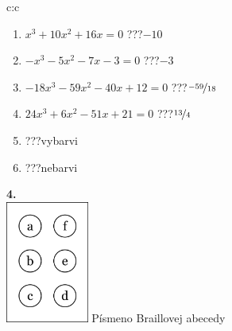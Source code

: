 \documentclass[10pt]{report}
\begin{document}
\begin{tabular}{c:c}
\begin{minipage}[c][104.5mm][t]{0.5\linewidth}
\begin{center}
\begin{minipage}{0.79\linewidth}
\begin{center}
\begin{varwidth}{\linewidth}
\begin{enumerate}
\Large
\item $x^3+10x^2+16x=0$\quad \dotfill\; ???\;\dotfill \quad $-10$
\item $-x^3-5x^2-7x-3=0$\quad \dotfill\; ???\;\dotfill \quad $-3$
\item $-18x^3-59x^2-40x+12=0$\quad \dotfill\; ???\;\dotfill \quad $\nicefrac{-59}{18}$
\item $24x^3+6x^2-51x+21=0$\quad \dotfill\; ???\;\dotfill \quad $\nicefrac{13}{4}$
\item \quad \dotfill\; ???\;\dotfill \quad vybarvi
\item \quad \dotfill\; ???\;\dotfill \quad nebarvi
\end{enumerate}
\end{varwidth}
\end{center}
\end{minipage}
\begin{minipage}{0.20\linewidth}
\begin{center}
{\Huge\bfseries 4.} \\[2mm]
\includegraphics[height=40mm]{../images/braille.png}
{\small Písmeno Braillovej abecedy}
\end{center}
\end{minipage}
\end{center}
\end{minipage}
%
\end{tabular}
\newpage
\thispagestyle{empty}
\end{document}
